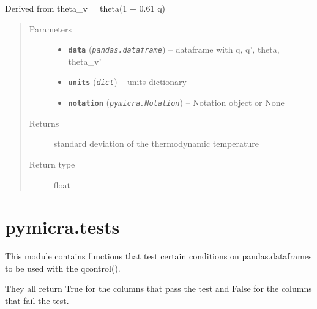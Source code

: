 \documentclass[a4paper,10pt,oneside]{sphinxmanual}
\begin{document}
\begin{fulllineitems}
\label{pymicra:pymicra.physics.theta_std_from_theta_v_fluc}
Derived from theta\_v = theta(1 + 0.61 q)
\begin{quote}\begin{description}
\item[{Parameters}] \leavevmode\begin{itemize}
\item {} 
\textbf{\texttt{data}} (\emph{\texttt{pandas.dataframe}}) -- dataframe with q, q', theta, theta\_v'

\item {} 
\textbf{\texttt{units}} (\emph{\texttt{dict}}) -- units dictionary

\item {} 
\textbf{\texttt{notation}} (\emph{\texttt{pymicra.Notation}}) -- Notation object or None

\end{itemize}

\item[{Returns}] \leavevmode
standard deviation of the thermodynamic temperature

\item[{Return type}] \leavevmode
float

\end{description}\end{quote}

\end{fulllineitems}



\section{pymicra.tests}
\label{pymicra:pymicra-tests}\label{pymicra:module-pymicra.tests}
This module contains functions that test certain conditions on pandas.dataframes to
be used with the qcontrol().

They all return True for the columns that pass the test and False for the columns
that fail the test.
\end{document}
